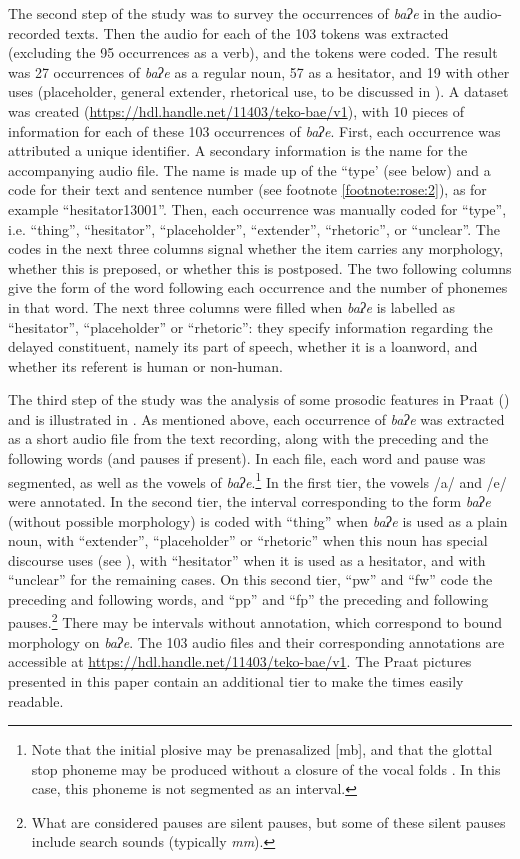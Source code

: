 \documentclass[output=paper]{langscibook}
\begin{document}
The second step of the study was to survey the occurrences of \textit{baʔe} in the audio-recorded texts. Then the audio for each of the 103 tokens was extracted (excluding the 95 occurrences as a verb), and the tokens were coded. The result was 27 occurrences of \textit{baʔe} as a regular noun, 57 as a hesitator, and 19 with other uses (placeholder, general extender, rhetorical use, to be discussed in ). A dataset was created (\url{https://hdl.handle.net/11403/teko-bae/v1}), with 10 pieces of information for each of these 103 occurrences of \textit{baʔe}. First, each occurrence was attributed a unique identifier. A secondary information is the name for the accompanying audio file. The name is made up of the “type’ (see below) and a code for their text and sentence number (see footnote \ref{footnote:rose:2}), as for example “hesitator13001”. Then, each occurrence was manually coded for “type”, i.e. “thing”, “hesitator”, “placeholder”, “extender”, “rhetoric”, or “unclear”. The codes in the next three columns signal whether the item carries any morphology, whether this is preposed, or whether this is postposed. The two following columns give the form of the word following each occurrence and the number of phonemes in that word. The next three columns were filled when \textit{baʔe} is labelled as “hesitator”, “placeholder” or “rhetoric”: they specify information regarding the delayed constituent, namely its part of speech, whether it is a loanword, and whether its referent is human or non-human.

The third step of the study was the analysis of some prosodic features in Praat (\citealt{BoersmaBoersma2023}) and is illustrated in . As mentioned above, each occurrence of \textit{baʔe} was extracted as a short audio file from the text recording, along with the preceding and the following words (and pauses if present). In each file, each word and pause was segmented, as well as the vowels of \textit{baʔe}.\footnote{Note that the initial plosive may be prenasalized [mb], and that the glottal stop phoneme may be produced without a closure of the vocal folds \citep[4--6]{Rose2021}. In this case, this phoneme is not segmented as an interval.} In the first tier, the vowels /a/ and /e/ were annotated. In the second tier, the interval corresponding to the form \textit{baʔe} (without possible morphology) is coded with “thing” when \textit{baʔe} is used as a plain noun, with “extender”, “placeholder” or “rhetoric” when this noun has special discourse uses (see ), with “hesitator” when it is used as a hesitator, and with “unclear” for the remaining cases. On this second tier, “pw” and “fw” code the preceding and following words, and “pp” and “fp” the preceding and following pauses.\footnote{What are considered pauses are silent pauses, but some of these silent pauses include search sounds (typically \textit{mm}).} There may be intervals without annotation, which correspond to bound morphology on \textit{baʔe}. The 103 audio files and their corresponding annotations are accessible at \url{https://hdl.handle.net/11403/teko-bae/v1}. The Praat pictures presented in this paper contain an additional tier to make the times easily readable.
\end{document}
